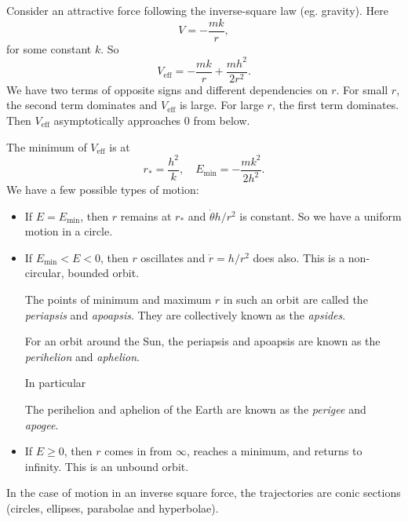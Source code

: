\documentclass[a4paper]{article}
\begin{document}
\begin{eg}
  Consider an attractive force following the inverse-square law (eg. gravity). Here
  \[
    V = -\frac{mk}{r},
  \]
  for some constant $k$. So
  \[
    V_{\text{eff}} = -\frac{mk}{r} + \frac{mh^2}{2r^2}.
  \]
  We have two terms of opposite signs and different dependencies on $r$. For small $r$, the second term dominates and $V_{\text{eff}}$ is large. For large $r$, the first term dominates. Then $V_{\text{eff}}$ asymptotically approaches $0$ from below.

  \begin{center}
  \end{center}

  The minimum of $V_{\text{eff}}$ is at
  \[
    r_{*} = \frac{h^2}{k},\quad E_{\text{min}} = -\frac{mk^2}{2h^2}.
  \]
  We have a few possible types of motion:
  \begin{itemize}
    \item If $E = E_{\min}$, then $r$ remains at $r_*$ and $\dot{\theta} h/r^2$ is constant. So we have a uniform motion in a circle.
    \item If $E_{\min} < E < 0$, then $r$ oscillates and $\dot{r}=h/r^2$ does also. This is a non-circular, bounded orbit.

      \begin{defi}
        The points of minimum and maximum $r$ in such an orbit are called the \emph{periapsis} and \emph{apoapsis}. They are collectively known as the \emph{apsides}.
      \end{defi}

      \begin{defi}
        For an orbit around the Sun, the periapsis and apoapsis are known as the \emph{perihelion} and \emph{aphelion}.
      \end{defi}
  
      In particular
      \begin{defi}
        The perihelion and aphelion of the Earth are known as the \emph{perigee} and \emph{apogee}.
      \end{defi}

    \item If $E \geq 0$, then $r$ comes in from $\infty$, reaches a minimum, and returns to infinity. This is an unbound orbit.
  \end{itemize}

  In the case of motion in an inverse square force, the trajectories are conic sections (circles, ellipses, parabolae and hyperbolae).
\end{eg}
\end{document}
